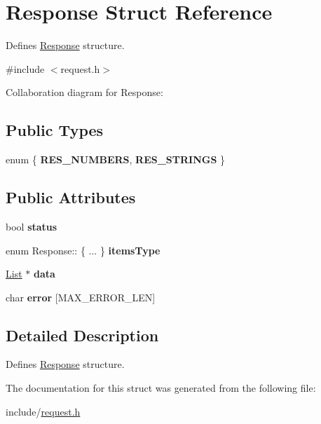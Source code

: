 \hypertarget{structResponse}{}\section{Response Struct Reference}
\label{structResponse}


Defines \hyperlink{structResponse}{Response} structure.  




{\ttfamily \#include $<$request.\+h$>$}



Collaboration diagram for Response\+:
\subsection*{Public Types}
\begin{DoxyCompactItemize}
\item 
enum \{ {\bfseries R\+E\+S\+\_\+\+N\+U\+M\+B\+E\+RS}, 
{\bfseries R\+E\+S\+\_\+\+S\+T\+R\+I\+N\+GS}
 \}\hypertarget{structResponse_aa388148c741d603347dbb98da4884073}{}\label{structResponse_aa388148c741d603347dbb98da4884073}

\end{DoxyCompactItemize}
\subsection*{Public Attributes}
\begin{DoxyCompactItemize}
\item 
bool {\bfseries status}\hypertarget{structResponse_afbbc48eb7e4ab82337494ef5f716b590}{}\label{structResponse_afbbc48eb7e4ab82337494ef5f716b590}

\item 
enum Response\+:: \{ ... \}  {\bfseries items\+Type}\hypertarget{structResponse_aed3dd874a8b06baa6d4f3eade04db4b3}{}\label{structResponse_aed3dd874a8b06baa6d4f3eade04db4b3}

\item 
\hyperlink{structList}{List} $\ast$ {\bfseries data}\hypertarget{structResponse_a233099b61e541ff683bf7561a209e8b9}{}\label{structResponse_a233099b61e541ff683bf7561a209e8b9}

\item 
char {\bfseries error} \mbox{[}M\+A\+X\+\_\+\+E\+R\+R\+O\+R\+\_\+\+L\+EN\mbox{]}\hypertarget{structResponse_a9b5aac99ce11e3551fa41beb253120d8}{}\label{structResponse_a9b5aac99ce11e3551fa41beb253120d8}

\end{DoxyCompactItemize}


\subsection{Detailed Description}
Defines \hyperlink{structResponse}{Response} structure. 

The documentation for this struct was generated from the following file\+:\begin{DoxyCompactItemize}
\item 
include/\hyperlink{request_8h}{request.\+h}\end{DoxyCompactItemize}

